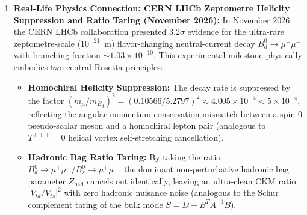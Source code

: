 \documentclass[11pt,a4paper]{article}
\begin{document}
\begin{enumerate}
  \item \textbf{Real-Life Physics Connection: CERN LHCb Zeptometre Helicity Suppression and Ratio Taring (November 2026):} In November 2026, the CERN LHCb collaboration presented $3.2\sigma$ evidence for the ultra-rare zeptometre-scale ($10^{-21}$~m) flavor-changing neutral-current decay $B_d^0 \to \mu^+ \mu^-$ with branching fraction $\sim 1.03 \times 10^{-10}$. This experimental milestone physically embodies two central Rosetta principles:
  \begin{itemize}
    \item \textbf{Homochiral Helicity Suppression:} The decay rate is suppressed by the factor $(m_\mu / m_{B_d})^2 = (0.10566 / 5.2797)^2 \approx 4.005 \times 10^{-4} < 5 \times 10^{-4}$, reflecting the angular momentum conservation mismatch between a spin-0 pseudo-scalar meson and a homochiral lepton pair (analogous to $T^{+++} = 0$ helical vortex self-stretching cancellation).
    \item \textbf{Hadronic Bag Ratio Taring:} By taking the ratio $B_d^0 \to \mu^+ \mu^- / B_s^0 \to \mu^+ \mu^-$, the dominant non-perturbative hadronic bag parameter $Z_{\mathrm{had}}$ cancels out identically, leaving an ultra-clean CKM ratio $|V_{td}/V_{ts}|^2$ with zero hadronic nuisance noise (analogous to the Schur complement taring of the bulk mode $S = D - B^T A^{-1} B$).
  \end{itemize}
\end{enumerate}
\end{document}
